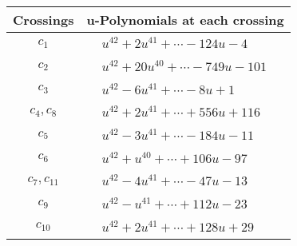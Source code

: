 \documentclass[1p]{elsarticle_modified}
\theoremstyle{definition}
\begin{document}
\begin{tabular}{m{50pt}|m{274pt}}
Crossings & \hspace{64pt}u-Polynomials at each crossing \\
\hline $$\begin{aligned}c_{1}\end{aligned}$$&$\begin{aligned}
&u^{42}+2 u^{41}+\cdots-124 u-4
\end{aligned}$\\
\hline $$\begin{aligned}c_{2}\end{aligned}$$&$\begin{aligned}
&u^{42}+20 u^{40}+\cdots-749 u-101
\end{aligned}$\\
\hline $$\begin{aligned}c_{3}\end{aligned}$$&$\begin{aligned}
&u^{42}-6 u^{41}+\cdots-8 u+1
\end{aligned}$\\
\hline $$\begin{aligned}c_{4},c_{8}\end{aligned}$$&$\begin{aligned}
&u^{42}+2 u^{41}+\cdots+556 u+116
\end{aligned}$\\
\hline $$\begin{aligned}c_{5}\end{aligned}$$&$\begin{aligned}
&u^{42}-3 u^{41}+\cdots-184 u-11
\end{aligned}$\\
\hline $$\begin{aligned}c_{6}\end{aligned}$$&$\begin{aligned}
&u^{42}+u^{40}+\cdots+106 u-97
\end{aligned}$\\
\hline $$\begin{aligned}c_{7},c_{11}\end{aligned}$$&$\begin{aligned}
&u^{42}-4 u^{41}+\cdots-47 u-13
\end{aligned}$\\
\hline $$\begin{aligned}c_{9}\end{aligned}$$&$\begin{aligned}
&u^{42}- u^{41}+\cdots+112 u-23
\end{aligned}$\\
\hline $$\begin{aligned}c_{10}\end{aligned}$$&$\begin{aligned}
&u^{42}+2 u^{41}+\cdots+128 u+29
\end{aligned}$\\
\hline
\end{tabular}\\~\\
\end{document}
